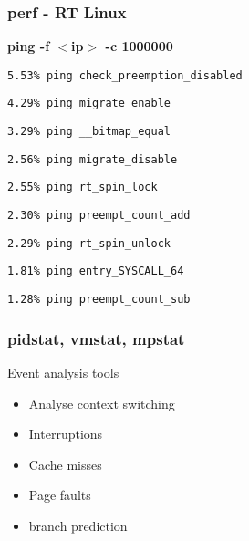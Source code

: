 \begin{frame}
	\frametitle{perf - RT Linux}
	\textbf{ping -f $<$ip$>$ -c 1000000}

\texttt{5.53\%  ping check\_preemption\_disabled}

\texttt{4.29\%  ping migrate\_enable}

\texttt{3.29\%  ping \_\_bitmap\_equal}

\texttt{2.56\%  ping migrate\_disable}

\texttt{2.55\%  ping rt\_spin\_lock}

\texttt{2.30\%  ping preempt\_count\_add}

\texttt{2.29\%  ping rt\_spin\_unlock}

\texttt{1.81\%  ping entry\_SYSCALL\_64}

\texttt{1.28\%  ping preempt\_count\_sub}
\end{frame}


\begin{frame}
	\frametitle{pidstat, vmstat, mpstat}
Event analysis tools
	\begin{itemize}
		\item Analyse context switching
		\item Interruptions
		\item Cache misses
		\item Page faults
		\item branch prediction
	\end{itemize}
\end{frame}

